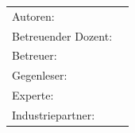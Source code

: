\begin{titlepage}
\begin{center}
	\vspace{5ex}
	\begin{framed}
		\timeperiod
	\end{framed}
\end{center}

\vspace{11ex}
\begin{tabular}{ll} %
	Autoren:         		& \authors    	\\
	Betreuender Dozent:		& \advisorprof  	\\
	Betreuer:        		& \advisor    	\\
	Gegenleser:      		& \contraprof  	\\
	Experte:      			& \expert  		\\
	Industriepartner:      	& \osag  		\\
\end{tabular}

\end{titlepage}

\restoregeometry %
